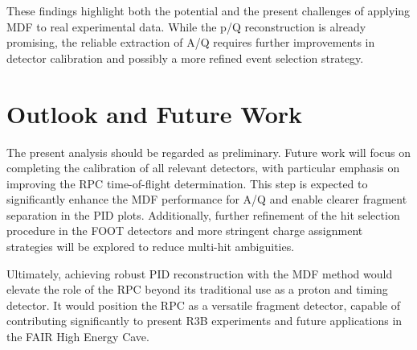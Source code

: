 These findings highlight both the potential and the present challenges of applying \gls{MDF} to real experimental data. While the p/Q reconstruction is already promising, the reliable extraction of A/Q requires further improvements in detector calibration and possibly a more refined event selection strategy.


\section{Outlook and Future Work}

The present analysis should be regarded as preliminary. Future work will focus on completing the calibration of all relevant detectors, with particular emphasis on improving the \gls{RPC} time-of-flight determination. This step is expected to significantly enhance the \gls{MDF} performance for A/Q and enable clearer fragment separation in the PID plots. Additionally, further refinement of the hit selection procedure in the FOOT detectors and more stringent charge assignment strategies will be explored to reduce multi-hit ambiguities.

Ultimately, achieving robust PID reconstruction with the \gls{MDF} method would elevate the role of the \gls{RPC} beyond its traditional use as a proton and timing detector. It would position the \gls{RPC} as a versatile fragment detector, capable of contributing significantly to present \gls{R3B} experiments and future applications in the \gls{FAIR} High Energy Cave.


